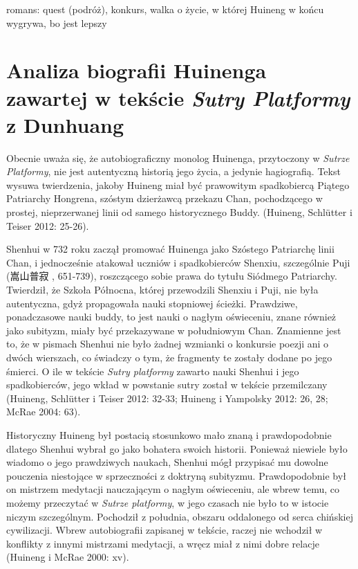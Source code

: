 romans: quest (podróż), konkurs, walka o życie, w której Huineng w końcu wygrywa, bo jest lepszy

\fi

\section{Analiza biografii Huinenga zawartej w tekście \textit{Sutry Platformy} z Dunhuang}
Obecnie uważa się, że autobiograficzny monolog Huinenga, przytoczony w \textit{Sutrze Platformy}, nie jest autentyczną historią jego życia, a jedynie hagiografią. Tekst wysuwa twierdzenia, jakoby Huineng miał być prawowitym spadkobiercą Piątego Patriarchy Hongrena, szóstym dzierżawcą przekazu Chan, pochodzącego w prostej, nieprzerwanej linii od samego historycznego Buddy. (Huineng, Schlütter i Teiser 2012: 25-26). %

Shenhui w 732 roku zaczął promować Huinenga jako Szóstego Patriarchę linii Chan, i jednocześnie atakował uczniów i spadkobierców Shenxiu, szczególnie Puji (嵩山普寂 , 651-739), roszczącego sobie prawa do tytułu Siódmego Patriarchy. Twierdził, że Szkoła Północna, której przewodzili Shenxiu i Puji, nie była autentyczna, gdyż propagowała nauki stopniowej ścieżki. Prawdziwe, ponadczasowe nauki buddy, to jest nauki o nagłym oświeceniu, znane również jako subityzm, miały być przekazywane w południowym Chan. Znamienne jest to, że w pismach Shenhui nie było żadnej wzmianki o konkursie poezji ani o dwóch wierszach, co świadczy o tym, że fragmenty te zostały dodane po jego śmierci. O ile w tekście \textit{Sutry platformy} zawarto nauki Shenhui i jego spadkobierców, jego wkład w powstanie sutry został w tekście przemilczany (Huineng, Schlütter i Teiser 2012: 32-33; Huineng i Yampolsky 2012: 26, 28; McRae 2004: 63).

Historyczny Huineng był postacią stosunkowo mało znaną i prawdopodobnie dlatego Shenhui wybrał go jako bohatera swoich historii. Ponieważ niewiele było wiadomo o jego prawdziwych naukach, Shenhui mógł przypisać mu dowolne pouczenia niestojące w sprzeczności z doktryną subityzmu. Prawdopodobnie był on mistrzem medytacji nauczającym o nagłym oświeceniu, ale wbrew temu, co możemy przeczytać w \textit{Sutrze platformy}, w jego czasach nie było to w istocie niczym szczególnym. Pochodził z południa, obszaru oddalonego od serca chińskiej cywilizacji. Wbrew autobiografii zapisanej w tekście, raczej nie wchodził w konflikty z innymi mistrzami medytacji, a wręcz miał z nimi dobre relacje (Huineng i McRae 2000: xv).

